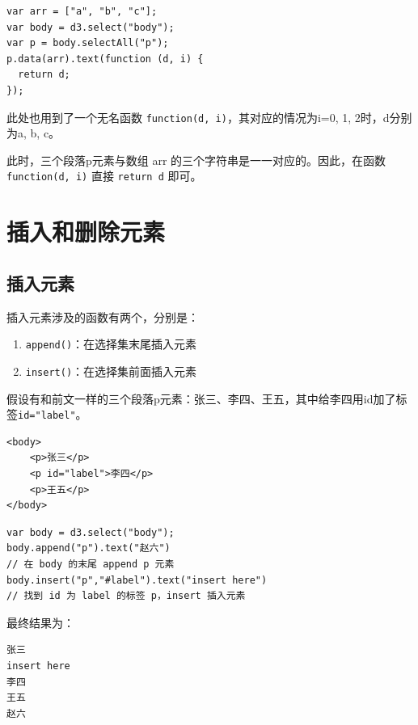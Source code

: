 \begin{verbatim}
var arr = ["a", "b", "c"];
var body = d3.select("body");
var p = body.selectAll("p");
p.data(arr).text(function (d, i) {
  return d;
});
\end{verbatim}

此处也用到了一个无名函数 \verb|function(d, i)|，其对应的情况为i=0, 1, 2时，d分别为a, b, c。

此时，三个段落p元素与数组 arr 的三个字符串是一一对应的。因此，在函数  \verb|function(d, i)| 直接 \verb|return d| 即可。

\section{插入和删除元素}

\subsection{插入元素}

插入元素涉及的函数有两个，分别是：

\begin{enumerate}
    \item \verb|append()|：在选择集末尾插入元素
    \item \verb|insert()|：在选择集前面插入元素
\end{enumerate}

假设有和前文一样的三个段落p元素：张三、李四、王五，其中给李四用id加了标签\verb|id="label"|。

\begin{verbatim}
<body>
    <p>张三</p>
    <p id="label">李四</p>
    <p>王五</p>
</body>
\end{verbatim}

\begin{verbatim}
var body = d3.select("body");
body.append("p").text("赵六")
// 在 body 的末尾 append p 元素
body.insert("p","#label").text("insert here")
// 找到 id 为 label 的标签 p，insert 插入元素
\end{verbatim}

最终结果为：

\begin{verbatim}
张三
insert here
李四
王五
赵六
\end{verbatim}

